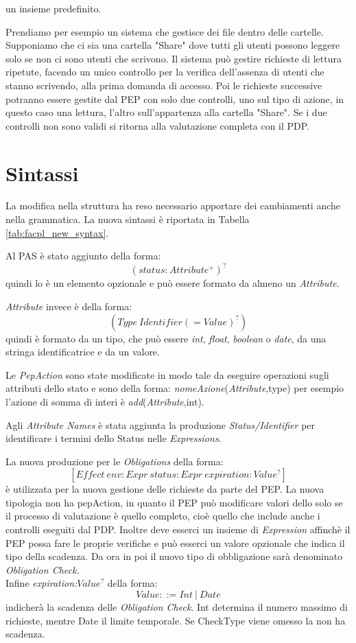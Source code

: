 un insieme predefinito.\par
Prendiamo per esempio un sistema che gestisce dei file dentro delle cartelle. Supponiamo che ci sia una cartella
"Share" dove tutti gli utenti possono leggere solo se non ci sono utenti che scrivono.
Il sistema può gestire richieste di lettura ripetute, facendo un unico controllo per la verifica dell'assenza di
utenti che stanno scrivendo, alla prima domanda di accesso. Poi le richieste successive potranno essere
gestite dal \ac{PEP} con solo due controlli, uno sul tipo di azione, in questo caso una lettura, l'altro sull'appartenza
alla cartella "Share". Se i due controlli non sono validi si ritorna alla valutazione completa con il \ac{PDP}.
\section{Sintassi}
\label{sec:SintassiNew}
La modifica nella struttura ha reso necessario apportare dei cambiamenti anche nella grammatica.
La nuova sintassi è riportata in Tabella \ref{tab:facpl_new_syntax}.\par
Al \ac{PAS} è stato aggiunto \status della forma:
$$(status: Attribute^+)^?$$
quindi lo \status è un elemento opzionale e può essere formato da almeno un \emph{ Attribute}.

\emph{ Attribute} invece è della forma:
$$(Type\ Identifier (= Value)^?)$$
quindi è formato da un tipo, che può essere \emph{int}, \emph{float}, \emph{boolean} o \emph{date}, da una stringa
identificatrice e da un valore.\par
Le \emph{PepAction} sono state modificate in modo tale da eseguire operazioni sugli attributi dello stato
e sono della forma: \emph{nomeAzione}(\emph{Attribute},type)
per esempio l'azione di somma di interi è \emph{add}(\emph{Attribute},int).\par
Agli \emph{Attribute Names} è stata aggiunta la produzione \textit{Status/Identifier} per identificare i
termini dello Status nelle \emph{Expressions}.\par
La nuova produzione per le \emph{Obligations} della forma:
$$[Effect\ env:Expr\  status:Expr \ expiration:Value^?]$$
è utilizzata per la nuova gestione delle richieste da parte del \ac{PEP}. La nuova tipologia
non ha pepAction, in quanto il \ac{PEP} può modificare valori dello \status solo se il processo di valutazione è quello
completo, cioè quello che include anche i controlli eseguiti dal \ac{PDP}. Inoltre deve esserci un insieme di \emph{Expression}
affinchè il \ac{PEP} possa fare le proprie verifiche e può esserci un valore opzionale che indica il tipo della scadenza.
Da ora in poi il nuovo tipo di obbligazione sarà denominato \emph{Obligation Check.}\\
Infine \emph{expiration:$Value^?$} della forma:
$$Value ::= Int\ |\ Date$$
indicherà la scadenza delle \emph{Obligation Check}. Int determina il numero massimo di richieste, mentre Date
il limite temporale. Se CheckType viene omesso la \eobligation non ha scadenza.
{\label{Sintassi ausiliaria di FACPL Aggiornata}}
{\label{Sintassi di FACPL Aggiornata}}


